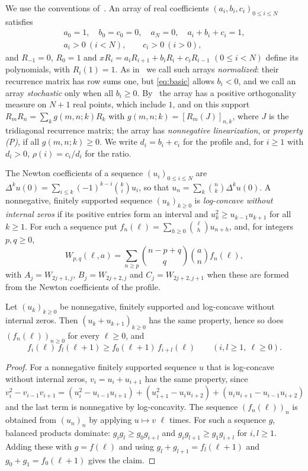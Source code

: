 We use the conventions of~\cite{P1}. An array of real coefficients $(a_i,b_i,c_i)_{0\leq i\leq N}$ satisfies
\begin{equation}\label{eq:basic}
\begin{gathered}
a_0=1,\quad b_0=c_0=0,\quad a_N=0,\quad a_i+b_i+c_i=1,\\
a_i>0\ (i<N),\qquad c_i>0\ (i>0),
\end{gathered}
\end{equation}
and $R_{-1}=0$, $R_0=1$ and $xR_i=a_iR_{i+1}+b_iR_i+c_iR_{i-1}$ $(0\leq i<N)$ define its polynomials, with $R_i(1)=1$. As in~\cite{P1} we call such arrays \emph{normalized}: their recurrence matrix has row sums one, but \eqref{eq:basic} allows $b_i<0$, and we call an array \emph{stochastic} only when all $b_i\geq0$. By~\cite[Lemma~]{P1} the array has a positive orthogonality measure on $N+1$ real points, which include $1$, and on this support $R_mR_n=\sum_kg(m,n;k)R_k$ with $g(m,n;k)=[R_m(J)]_{n,k}$, where $J$ is the tridiagonal recurrence matrix; the array has \emph{nonnegative linearization}, or \emph{property (P)}, if all $g(m,n;k)\geq0$. We write $d_i=b_i+c_i$ for the profile and, for $i\geq1$ with $d_i>0$, $\rho(i)=c_i/d_i$ for the ratio.

The Newton coefficients of a sequence $(u_i)_{0\leq i\leq N}$ are $\Delta^ku(0)=\sum_{i\leq k}(-1)^{k-i}\binom kiu_i$, so that $u_n=\sum_k\binom nk\Delta^ku(0)$. A nonnegative, finitely supported sequence $(u_k)_{k\geq0}$ is \emph{log-concave without internal zeros} if its positive entries form an interval and $u_k^2\geq u_{k-1}u_{k+1}$ for all $k\geq1$. For such a sequence put $f_n(\ell)=\sum_{h\geq0}\binom\ell hu_{n+h}$, and, for integers $p,q\geq0$,
\[
W_{p,q}(\ell,a)=\sum_{n\geq p}\binom{n-p+q}q\binom anf_n(\ell),
\]
with $A_j=W_{2j+1,j}$, $B_j=W_{2j+2,j}$ and $C_j=W_{2j+2,j+1}$ when these are formed from the Newton coefficients of the profile.

\begin{lemma}[\cite{P1}]\label{lem:lc-ineq}
Let $(u_k)_{k\geq0}$ be nonnegative, finitely supported and log-concave without internal zeros. Then $(u_k+u_{k+1})_{k\geq0}$ has the same property, hence so does $(f_n(\ell))_{n\geq0}$ for every $\ell\geq0$, and
\[
f_i(\ell)\,f_l(\ell+1)\geq f_0(\ell+1)\,f_{i+l}(\ell)\qquad(i,l\geq1,\ \ell\geq0).
\]
\end{lemma}
\begin{proof}

For a nonnegative finitely supported sequence $u$ that is log-concave without internal zeros, $v_i=u_i+u_{i+1}$ has the same property, since
$v_i^2-v_{i-1}v_{i+1}=(u_i^2-u_{i-1}u_{i+1})+(u_{i+1}^2-u_iu_{i+2})+(u_iu_{i+1}-u_{i-1}u_{i+2})$
and the last term is nonnegative by log-concavity. The sequence $(f_n(\ell))_n$ is obtained from $(u_n)_n$ by applying $u\mapsto v$ $\ell$ times. For such a sequence $g$, balanced products dominate: $g_ig_l\geq g_0g_{i+l}$ and $g_ig_{l+1}\geq g_1g_{i+l}$ for $i,l\geq1$. Adding these with $g=f(\ell)$ and using $g_l+g_{l+1}=f_l(\ell+1)$ and $g_0+g_1=f_0(\ell+1)$ gives the claim.
\end{proof}

